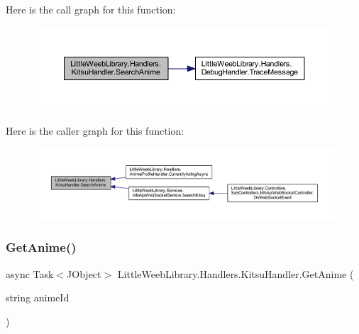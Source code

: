 Here is the call graph for this function\+:\nopagebreak
\begin{figure}[H]
\begin{center}
\leavevmode
\includegraphics[width=350pt]{class_little_weeb_library_1_1_handlers_1_1_kitsu_handler_a92f121e8fec8cce5ffe0454d3a17c156_cgraph}
\end{center}
\end{figure}
Here is the caller graph for this function\+:\nopagebreak
\begin{figure}[H]
\begin{center}
\leavevmode
\includegraphics[width=350pt]{class_little_weeb_library_1_1_handlers_1_1_kitsu_handler_a92f121e8fec8cce5ffe0454d3a17c156_icgraph}
\end{center}
\end{figure}
\mbox{\label{class_little_weeb_library_1_1_handlers_1_1_kitsu_handler_a4c88ed25befe2904416b4d90673a8f82}} 
\subsubsection{\texorpdfstring{Get\+Anime()}{GetAnime()}}
{\footnotesize\ttfamily async Task$<$J\+Object$>$ Little\+Weeb\+Library.\+Handlers.\+Kitsu\+Handler.\+Get\+Anime (\begin{DoxyParamCaption}\item[{string}]{anime\+Id }\end{DoxyParamCaption})}




